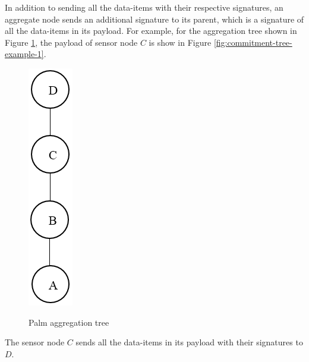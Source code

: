 	In addition to sending all the data-items with their respective signatures, an aggregate node sends an additional signature to its parent, which is a signature of all the data-items in its payload.
	For example, for the aggregation tree shown in Figure \ref{fig:Palm aggregation tree}, the payload of sensor node $C$ is show in Figure \ref{fig:commitment-tree-example-1}.
			\begin{figure}[h!]
				\centering
				\includegraphics[scale = 0.5]{images/palm-aggregation-tree.png}\\
				\caption{Palm aggregation tree}
				\label{fig:Palm aggregation tree}
			\end{figure}
		The sensor node $C$ sends all the data-items in its payload with their signatures to $D$.
